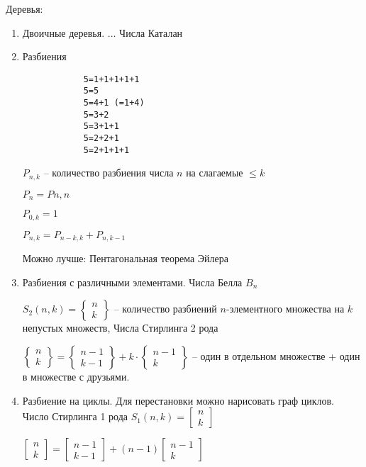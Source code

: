\documentclass{book}
\theoremstyle{definition}
\begin{document}
Деревья:
\begin{enumerate}
    \item Двоичные деревья.
$\ldots$
        Числа Каталан
    \item Разбиения 

        \begin{verbatim}
            5=1+1+1+1+1
            5=5
            5=4+1 (=1+4)
            5=3+2 
            5=3+1+1
            5=2+2+1
            5=2+1+1+1
        \end{verbatim}
        $P_{n,k}$ -- количество разбиения числа  $n$ на слагаемые  $\leqslant k$

        $P_n = P{n,n}$

        $P_{0,k} = 1$

        $P_{n,k} = P_{n-k,k} + P_{n,k-1}$

        Можно лучше: Пентагональная теорема Эйлера
    \item Разбиения с различными элементами. Числа Белла  $B_n$

        $S_2(n,k) = 
            \begin{Bmatrix}
            n\\k
        \end{Bmatrix}
        $ -- количество разбиений $n$-элементного множества на $k$ непустых множеств, Числа Стирлинга 2 рода

   $
   \begin{Bmatrix}
       n \\ k 
   \end{Bmatrix} = 
   \begin{Bmatrix}
       n-1\\k-1 
   \end{Bmatrix} + 
   k \cdot  \begin{Bmatrix}
       n-1\\k
   \end{Bmatrix}$ --  один в отдельном множестве + один в множестве с друзьями.
   \item Разбиение на циклы. Для перестановки можно нарисовать граф циклов. Число Стирлинга 1 рода $S_1(n,k) = \begin{bmatrix} n\\k \end{bmatrix} $

       $\begin{bmatrix} n\\k \end{bmatrix}  = \begin{bmatrix} n-1\\k-1 \end{bmatrix} +(n-1)\begin{bmatrix} n-1\\k \end{bmatrix} $
\end{enumerate}
\end{document}
